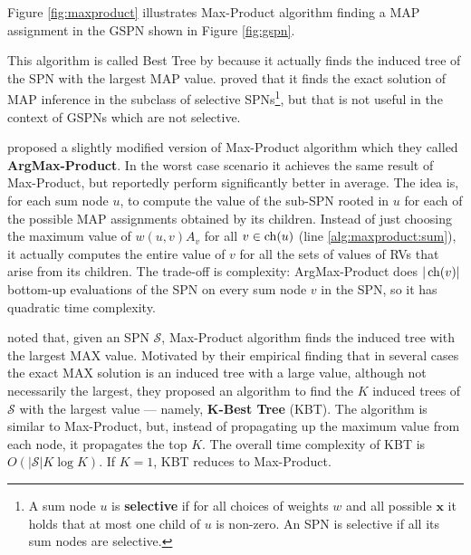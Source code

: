 Figure \ref{fig:maxproduct} illustrates Max-Product algorithm finding a MAP assignment in the GSPN shown in Figure \ref{fig:gspn}.

This algorithm is called Best Tree by \citet{Mei2017} because it actually finds the induced tree of the SPN with the largest MAP value. \citet{Peharz2016} proved that it finds the exact solution of MAP inference in the subclass of selective SPNs\footnote{A sum node $u$ is \textbf{selective} if for all choices of weights $w$ and all possible $\mathbf{x}$ it holds that at most one child of $u$ is non-zero. An SPN is selective if all its sum nodes are selective.}, but that is not useful in the context of GSPNs which are not selective.

\vspace{1em}

\citet{Conaty2017} proposed a slightly modified version of Max-Product algorithm which they called \textbf{ArgMax-Product}. In the worst case scenario it achieves the same result of Max-Product, but reportedly perform significantly better in average. The idea is, for each sum node $u$, to compute the value of the sub-SPN rooted in $u$ for each of the possible MAP assignments obtained by its children. Instead of just choosing the maximum value of $w(u, v) A_v$ for all $v \in \operatorname*{ch}(u)$ (line \ref{alg:maxproduct:sum}), it actually computes the entire value of $v$ for all the sets of values of RVs that arise from its children. The trade-off is complexity: ArgMax-Product does $|\operatorname*{ch}(v)|$ bottom-up evaluations of the SPN on every sum node $v$ in the SPN, so it has quadratic time complexity.

\vspace{1em}

\citet{Mei2017} noted that, given an SPN $\mathcal{S}$, Max-Product algorithm finds the induced tree with the largest MAX value. Motivated by their empirical finding that in several cases the exact MAX solution is an induced tree with a large value, although not necessarily the largest, they proposed an algorithm to find the $K$ induced trees of $\mathcal{S}$ with the largest value --- namely, \textbf{K-Best Tree} (KBT). The algorithm is similar to Max-Product, but, instead of propagating up the maximum value from each node, it propagates the top $K$. The overall time complexity of KBT is $O(|\mathcal{S}| K \log{K})$. If $K = 1$, KBT reduces to Max-Product.
